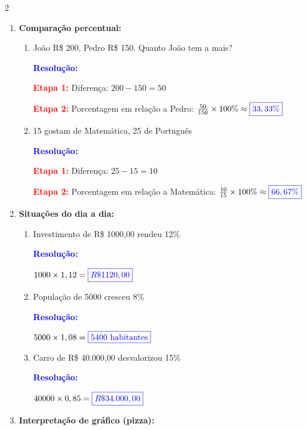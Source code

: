 \documentclass[11pt]{article}
\newcommand{\respostaNum}[1]{\textcolor{blue}{\boxed{#1}}}
\newcommand{\resolucao}{\textbf{\textcolor{blue}{Resolução:}}}
\begin{document}
\begin{multicols}{2}
\begin{enumerate}[leftmargin=*, start=9]
\item \textbf{Comparação percentual:}

\begin{enumerate}[label=\alph*)]
\item João R\$ 200, Pedro R\$ 150. Quanto João tem a mais?

\resolucao

\textbf{\textcolor{red}{Etapa 1:}} Diferença: $200 - 150 = 50$

\textbf{\textcolor{red}{Etapa 2:}} Porcentagem em relação a Pedro: $\frac{50}{150} \times 100\% \approx \respostaNum{33,33\%}$

\item 15 gostam de Matemática, 25 de Português

\resolucao

\textbf{\textcolor{red}{Etapa 1:}} Diferença: $25 - 15 = 10$

\textbf{\textcolor{red}{Etapa 2:}} Porcentagem em relação a Matemática: $\frac{10}{15} \times 100\% \approx \respostaNum{66,67\%}$
\end{enumerate}

\item \textbf{Situações do dia a dia:}

\begin{enumerate}[label=\alph*)]
\item Investimento de R\$ 1000,00 rendeu 12\%

\resolucao

$1000 \times 1,12 = \respostaNum{R\$ 1120,00}$

\item População de 5000 cresceu 8\%

\resolucao

$5000 \times 1,08 = \respostaNum{5400 \text{ habitantes}}$

\item Carro de R\$ 40.000,00 desvalorizou 15\%

\resolucao

$40000 \times 0,85 = \respostaNum{R\$ 34.000,00}$
\end{enumerate}

\item \textbf{Interpretação de gráfico (pizza):}

\begin{center}
\end{center}


\end{enumerate}
\end{multicols}
\end{document}
